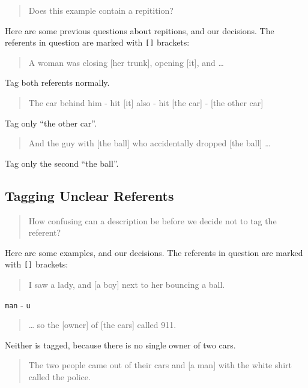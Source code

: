 \documentclass[
]{book}
\begin{document}
\begin{quote}
Does this example contain a repitition?
\end{quote}

Here are some previous questions about repitions, and our decisions.
The referents in question are marked with \texttt{{[}{]}} brackets:

\begin{quote}
A woman was closing {[}her trunk{]}, opening {[}it{]}, and \ldots{}
\end{quote}

Tag both referents normally.

\begin{quote}
The car behind him - hit {[}it{]} also - hit {[}the car{]} - {[}the other car{]}
\end{quote}

Tag only ``the other car''.

\begin{quote}
And the guy with {[}the ball{]} who accidentally dropped {[}the ball{]} \ldots{}
\end{quote}

Tag only the second ``the ball''.

\hypertarget{tagging-unclear-referents}{%
\subsection{Tagging Unclear Referents}\label{tagging-unclear-referents}}

\begin{quote}
How confusing can a description be before we decide not to tag the referent?
\end{quote}

Here are some examples, and our decisions.
The referents in question are marked with \texttt{{[}{]}} brackets:

\begin{quote}
I saw a lady, and {[}a boy{]} next to her bouncing a ball.
\end{quote}

\texttt{man} - \texttt{u}

\begin{quote}
\ldots{} so the {[}owner{]} of {[}the cars{]} called 911.
\end{quote}

Neither is tagged, because there is no single owner of two cars.

\begin{quote}
The two people came out of their cars and {[}a man{]} with the white shirt called the police.
\end{quote}
\end{document}

